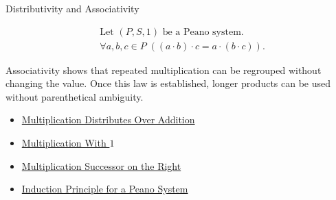 \begin{topicbox}{Distributivity and Associativity}
\begin{remark*}
\[
\begin{aligned}
&\text{Let } (P,S,1) \text{ be a Peano system.}\\
&\forall a,b,c \in P\;((a \cdot b) \cdot c = a \cdot (b \cdot c)).
\end{aligned}
\]
\end{remark*}

\begin{remark*}[Interpretation]
Associativity shows that repeated multiplication can be regrouped without
changing the value. Once this law is established, longer products can be used
without parenthetical ambiguity.
\end{remark*}

\begin{dependencies}
\begin{itemize}
  \item \hyperref[thm:multiplication-distributes-over-addition]{Multiplication Distributes Over Addition}
  \item \hyperref[thm:multiplication-with-one]{Multiplication With $1$}
  \item \hyperref[thm:multiplication-successor-on-right]{Multiplication Successor on the Right}
  \item \hyperref[thm:induction-principle-for-peano-system]{Induction Principle for a Peano System}
\end{itemize}
\end{dependencies}
\end{topicbox}

